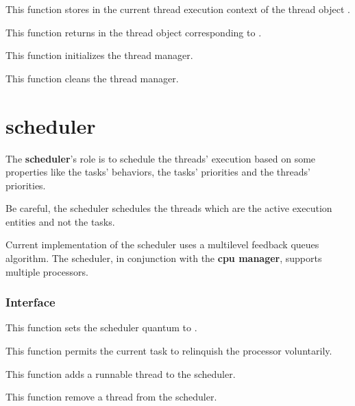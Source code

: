 	 {
	   This function stores in  the current
	   thread execution context of the thread object .
	 }

	 {
	   This function returns in  the thread object
	   corresponding to .
	 }

	 {
	   This function initializes the thread manager.
	 }

	 {
	   This function cleans the thread manager.
	 }

%
%

\section{scheduler}

The \textbf{scheduler}'s role is to schedule the threads' execution
based on some properties like the tasks' behaviors, the tasks' priorities
and the threads' priorities.

Be careful, the scheduler schedules the threads which are the active
execution entities and not the tasks.

Current implementation of the scheduler uses a multilevel feedback
queues algorithm. The scheduler, in conjunction with the \textbf{cpu
manager}, supports multiple processors.

%
%

\subsubsection{Interface}

	 {
	   This function sets the scheduler quantum to .
	 }

	 {
	   This function permits the current task to relinquish
	   the processor  voluntarily.
	 }

	 {
	   This function adds a runnable thread to the scheduler.
	 }

	 {
	   This function remove a thread from the scheduler.
	 }


